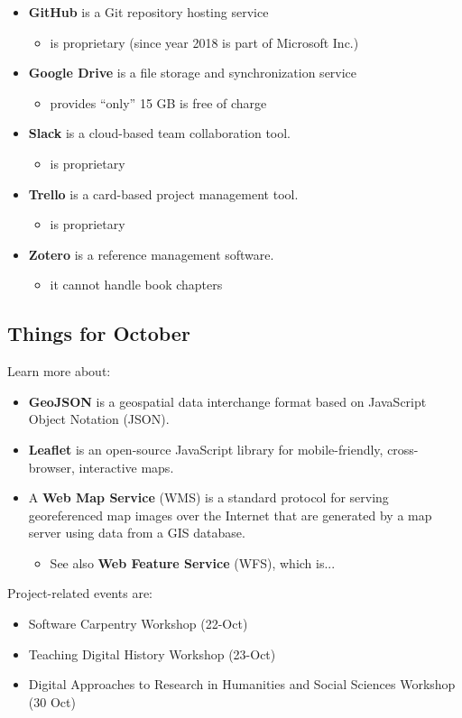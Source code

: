\documentclass[oneside,a4paper]{memoir} %
\begin{document}
\begin{itemize}
	\item \textbf{GitHub} is a Git repository hosting service
	\begin{itemize}
		\item is proprietary (since year 2018 is part of Microsoft Inc.)
	\end{itemize}
	\item \textbf{Google Drive} is a file storage and synchronization service  
	\begin{itemize}
		\item  provides \enquote{only} 15 GB is free of charge
	\end{itemize}
	\item \textbf{Slack} is a cloud-based team collaboration tool.
	\begin{itemize}
		\item  is proprietary
	\end{itemize}
	\item \textbf{Trello} is a card-based project management tool.
	\begin{itemize}
		\item  is proprietary
	\end{itemize}
	\item \textbf{Zotero} is a reference management software.
	\begin{itemize}
		\item it cannot handle book chapters
	\end{itemize}
\end{itemize}


\bigbreak


\subsection{Things for October}


Learn more about:

\begin{itemize}
	\item \textbf{GeoJSON} is a geospatial data interchange format based on JavaScript Object Notation (JSON).
	\item \textbf{Leaflet} is an open-source JavaScript library for mobile-friendly, cross-browser, interactive maps.
	\item A \textbf{Web Map Service} (WMS) is a standard protocol for serving georeferenced map images over the Internet that are generated by a map server using data from a GIS database.
	\begin{itemize}
		\item See also \textbf{Web Feature Service} (WFS), which is...
	\end{itemize}
\end{itemize}


\bigbreak
\bigbreak
\noindent
Project-related events are: 

\begin{itemize}
	\item Software Carpentry Workshop (22-Oct)
	\item Teaching Digital History Workshop (23-Oct)
	\item Digital Approaches to Research in Humanities and Social Sciences Workshop (30 Oct)
\end{itemize}



\printglossaries
\end{document}
